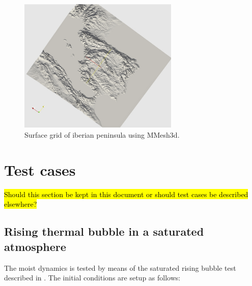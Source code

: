 \documentclass{article}
\begin{document}
\begin{figure}[htbp]
\centering
\includegraphics[width=3in]{mmesh3d_spain_surface_grid.png}
\caption{Surface grid of iberian peninsula using MMesh3d.}
\label{fig:spainSurfaceGrid}
\end{figure}

\section{Test cases}
\hl{Should this section be kept in this document or should test cases be described elsewhere?}
\subsection{Rising thermal bubble in a saturated atmosphere}
The moist dynamics is tested by means of the saturated rising bubble test described in \cite{Pressel15a}. The initial conditions are setup as follows:
\end{document}
